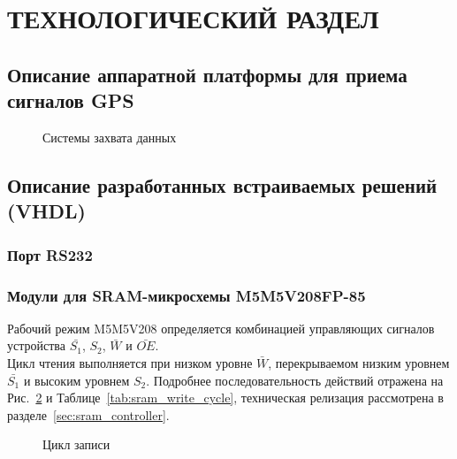 \section{ТЕХНОЛОГИЧЕСКИЙ РАЗДЕЛ}

\subsection{Описание аппаратной платформы для приема сигналов GPS}

\begin{figure}[H]
\caption{Системы захвата данных}
\label{pic_acq}
\end{figure}

\subsection{Описание разработанных встраиваемых решений (VHDL)}

\subsubsection{Порт RS232}
\label{razdel3_rs232}

\subsubsection{Модули для SRAM-микросхемы M5M5V208FP-85}
\label{razdel3_sram}
Рабочий режим M5M5V208 определяется комбинацией управляющих сигналов устройства $\bar{S_1}$, ${S_2}$, $\bar{W}$ и $\bar{OE}$.\\
Цикл чтения выполняется при низком уровне $\bar{W}$, перекрываемом низким уровнем $\bar{S_1}$ и высоким уровнем ${S_2}$.
Подробнее последовательность действий отражена на Рис.~\ref{pic:sram_write_cycle} и Таблице~\ref{tab:sram_write_cycle}, техническая релизация рассмотрена в
разделе~\ref{sec:sram_controller}. \\

\begin{figure}[H]
\caption{Цикл записи}
\label{pic:sram_write_cycle}
\end{figure}

